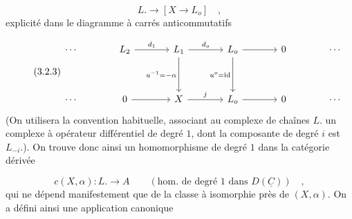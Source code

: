 \begin{equation}\tag{3.2.2}
L. \longrightarrow [X \longrightarrow L_o] \quad ,
\end{equation}
explicité dans le diagramme à carrés anticommutatifs

\begin{equation}\tag{3.2.3}
\begin{tikzcd}[column sep=large, row sep=huge]
\cdots & L_2 \arrow[r, "d_1"] & L_1 \arrow[r, "d_o"] \arrow[d, "u^{-1} = -\alpha"'] & L_o \arrow[r] \arrow[d, "u^o = \mathrm{id}"'] & 0 & \cdots \\
\cdots & 0 \arrow[r] & X \arrow[r, "j"] & L_o \arrow[r] & 0 & \cdots
\end{tikzcd}
\end{equation}
(On utilisera la convention habituelle, associant au complexe de chaînes $L.$ un complexe à opérateur différentiel de degré $1$, dont la composante de degré $i$ est $L_{-i}$.). On trouve donc ainsi un homomorphisme de degré $1$ dans la catégorie dérivée

\begin{equation}\tag{3.2.3}
c(X,\alpha) : L. \longrightarrow A \qquad (\text{hom. de degré 1 dans } D(\underline{C})) \quad ,
\end{equation}
qui ne dépend manifestement que de la classe à isomorphie près de $(X,\alpha)$. On a défini ainsi une application canonique

